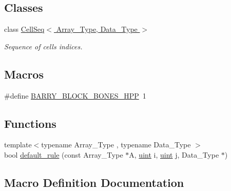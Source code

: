 \subsection*{Classes}
\begin{DoxyCompactItemize}
\item 
class \hyperlink{class_cell_seq}{Cell\+Seq$<$ Array\+\_\+\+Type, Data\+\_\+\+Type $>$}
\begin{DoxyCompactList}\small\item\em Sequence of cells indices. \end{DoxyCompactList}\end{DoxyCompactItemize}
\subsection*{Macros}
\begin{DoxyCompactItemize}
\item 
\#define \hyperlink{barry_8hpp_ae8f9d4181425b0f42e8ff4de2449b553}{B\+A\+R\+R\+Y\+\_\+\+B\+L\+O\+C\+K\+\_\+\+B\+O\+N\+E\+S\+\_\+\+H\+PP}~1
\end{DoxyCompactItemize}
\subsection*{Functions}
\begin{DoxyCompactItemize}
\item 
{\footnotesize template$<$typename Array\+\_\+\+Type , typename Data\+\_\+\+Type $>$ }\\bool \hyperlink{block-bones_8hpp_a4aff3c5c755b16bc4634ab8d8e7fb3f6}{default\+\_\+rule} (const Array\+\_\+\+Type $\ast$A, \hyperlink{typedefs_8hpp_a91ad9478d81a7aaf2593e8d9c3d06a14}{uint} i, \hyperlink{typedefs_8hpp_a91ad9478d81a7aaf2593e8d9c3d06a14}{uint} j, Data\+\_\+\+Type $\ast$)
\end{DoxyCompactItemize}


\subsection{Macro Definition Documentation}
\mbox{\label{barry_8hpp_ae8f9d4181425b0f42e8ff4de2449b553}} 
